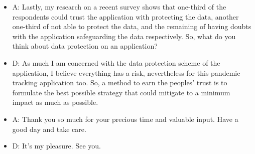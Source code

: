 \begin{itemize}
    \item A: Lastly, my research on a recent survey shows that one-third of the respondents could trust the
    application with protecting the data, another one-third of not able to protect the data, and the
    remaining of having doubts with the application safeguarding the data respectively. So, what
    do you think about data protection on an application?
    \item D: As much I am concerned with the data protection scheme of the application, I believe
    everything has a risk, nevertheless for this pandemic tracking application too. So, a method to
    earn the peoples’ trust is to formulate the best possible strategy that could mitigate to a minimum
    impact as much as possible.
    \item A: Thank you so much for your precious time and valuable input. Have a good day and take care.
    \item D: It’s my pleasure. See you.
  \end{itemize}